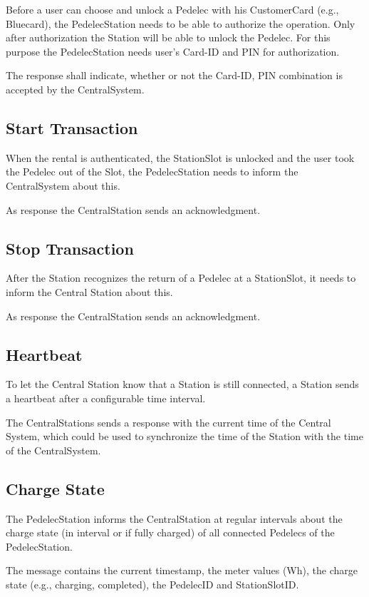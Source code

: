 Before a user can choose and unlock a Pedelec with his CustomerCard (e.g., Bluecard), the PedelecStation needs to be able to authorize the operation. Only after authorization the Station will be able to unlock the Pedelec. For this purpose the PedelecStation needs user's Card-ID and PIN for authorization.

The response shall indicate, whether or not the Card-ID, PIN combination is accepted by the CentralSystem.

\subsection{Start Transaction}

When the rental is authenticated, the StationSlot is unlocked and the user took the Pedelec out of the Slot, the PedelecStation needs to inform the CentralSystem about this.

As response the CentralStation sends an acknowledgment.

\subsection{Stop Transaction}

After the Station recognizes the return of a Pedelec at a StationSlot, it needs to inform the Central Station about this.

As response the CentralStation sends an acknowledgment.

\subsection{Heartbeat}

To let the Central Station know that a Station is still connected, a Station sends a heartbeat after a configurable time interval.

The CentralStations sends a response with the current time of the Central System, which could be used to synchronize the time of the Station with the time of the CentralSystem.

\subsection{Charge State}

The PedelecStation informs the CentralStation at regular intervals about the charge state (in interval or if fully charged) of all connected Pedelecs of the PedelecStation.

The message contains the current timestamp, the meter values (Wh), the charge state (e.g., charging, completed), the PedelecID and StationSlotID.